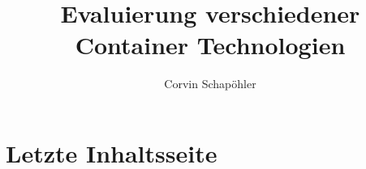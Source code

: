 

\title{Evaluierung verschiedener Container Technologien}
\author{Corvin Schapöhler}


	
	
	
	\frontmatter
	
%	
	

	\setcounter{tocdepth}{1}
	\tableofcontents

	\mainmatter
	\pagestyle{main}
	
	
	
	\chapter{Letzte Inhaltsseite}
	
	\backmatter
	
	
